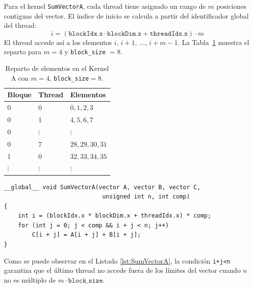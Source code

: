 \documentclass[12pt]{article}
\newenvironment{exercise}[2][Ejercicio]{\begin{trivlist}
\item[\hskip \labelsep {\bfseries #1}\hskip \labelsep {\bfseries #2.}]}{\end{trivlist}}
\begin{document}
\begin{exercise}{1}
    Para el kernel \texttt{SumVectorA}, cada thread tiene asignado un rango de $m$ posiciones
    contiguas del vector. El índice de inicio se calcula a partir del identificador global del thread:
    \begin{equation}
        i = (\texttt{blockIdx.x} \cdot \texttt{blockDim.x} + \texttt{threadIdx.x}) \cdot m
    \end{equation}
    El thread accede así a los elementos $i,\, i+1,\, \ldots,\, i+m-1$. La Tabla~\ref{tab:kernelA}
    muestra el reparto para $m = 4$ y \texttt{block\_size} $= 8$.

    \begin{table}[h]
        \centering
        \begin{tabular}{lll}
            \hline
            \textbf{Bloque} & \textbf{Thread} & \textbf{Elementos} \\
            \hline
            0               & 0               & $0,1,2,3$          \\
            0               & 1               & $4,5,6,7$          \\
            0               & $\vdots$        & $\vdots$           \\
            0               & 7               & $28,29,30,31$      \\
            1               & 0               & $32,33,34,35$      \\
            $\vdots$        & $\vdots$        & $\vdots$           \\
            \hline
        \end{tabular}
        \caption{Reparto de elementos en el Kernel A con $m=4$, \texttt{block\_size}$=8$.}
        \label{tab:kernelA}
    \end{table}

    \begin{lstlisting}[caption={Kernel \texttt{SumVectorA}: acceso consecutivo.}, label={lst:SumVectorA}]
__global__ void SumVectorA(vector A, vector B, vector C,
                            unsigned int n, int comp)
{
    int i = (blockIdx.x * blockDim.x + threadIdx.x) * comp;
    for (int j = 0; j < comp && i + j < n; j++)
        C[i + j] = A[i + j] + B[i + j];
}
    \end{lstlisting}

    Como se puede observar en el Listado \ref{lst:SumVectorA}, la condición \texttt{i+j<n} garantiza
    que el último thread no accede fuera de los límites del vector cuando $n$ no es múltiplo de
    $m \cdot \texttt{block\_size}$.


\end{exercise}
\end{document}
